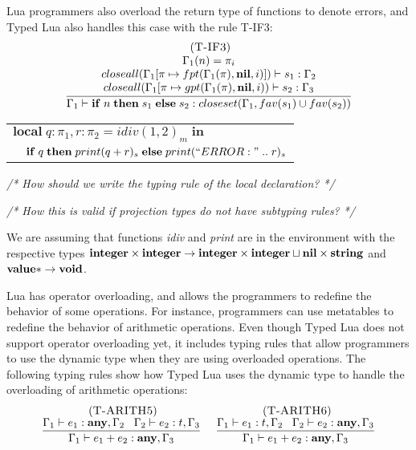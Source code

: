 Lua programmers also overload the return type of functions to denote
errors, and Typed Lua also handles this case with the rule \textsc{T-IF3}:
\[
\begin{array}{c}
\; (\textsc{T-IF3})\\
\dfrac{\begin{array}{c}
       \Gamma_{1}(n) = \pi_{i}\\
       closeall(\Gamma_{1}[\pi \mapsto fpt(\Gamma_{1}(\pi), \mathbf{nil}, i)]) \vdash s_{1}:\Gamma_{2} \\
       closeall(\Gamma_{1}[\pi \mapsto gpt(\Gamma_{1}(\pi), \mathbf{nil}, i)) \vdash s_{2}:\Gamma_{3}
      \end{array}}
      {\Gamma_{1} \vdash \mathbf{if} \; n \; \mathbf{then} \; s_{1} \; \mathbf{else} \; s_{2}:closeset(\Gamma_{1}, fav(s_{1}) \cup fav(s_{2}))}

\end{array}
\]

\begin{center}
\begin{tabular}{ll}
\multicolumn{2}{l}{$\mathbf{local} \; q:\pi_{1}, r:\pi_{2} = idiv(1, 2)_{m} \; \mathbf{in}$}\\
& \multicolumn{1}{l}{$\mathbf{if} \; q \; \mathbf{then} \; print(q + r)_{s} \; \mathbf{else} \; print(``ERROR: " \; .. \; r)_{s}$}
\end{tabular}
\end{center}

\textit{/* How should we write the typing rule of the local declaration? */}

\textit{/* How this is valid if projection types do not have subtyping rules? */}

We are assuming that functions \emph{idiv} and \emph{print} are in
the environment with the respective types
$\mathbf{integer} \times \mathbf{integer} \rightarrow \mathbf{integer} \times \mathbf{integer} \sqcup \mathbf{nil} \times \mathbf{string}$
and
$\mathbf{value}{*} \rightarrow \mathbf{void}$.

Lua has operator overloading, and allows the programmers to redefine
the behavior of some operations.
For instance, programmers can use metatables to redefine the
behavior of arithmetic operations.
Even though Typed Lua does not support operator overloading yet,
it includes typing rules that allow programmers to use the
dynamic type when they are using overloaded operations.
The following typing rules show how Typed Lua uses the dynamic type
to handle the overloading of arithmetic operations:
\[
\begin{array}{c}
\begin{array}{c}
\; (\textsc{T-ARITH5})\\
\dfrac{\Gamma_{1} \vdash e_{1}:\mathbf{any}, \Gamma_{2} \;\;\;
       \Gamma_{2} \vdash e_{2}:t, \Gamma_{3}}
      {\Gamma_{1} \vdash e_{1} + e_{2}:\mathbf{any}, \Gamma_{3}}
\end{array}
\;
\begin{array}{c}
\; (\textsc{T-ARITH6})\\
\dfrac{\Gamma_{1} \vdash e_{1}:t, \Gamma_{2} \;\;\;
       \Gamma_{2} \vdash e_{2}:\mathbf{any}, \Gamma_{3}}
      {\Gamma_{1} \vdash e_{1} + e_{2}:\mathbf{any}, \Gamma_{3}}
\end{array}
\end{array}
\]

